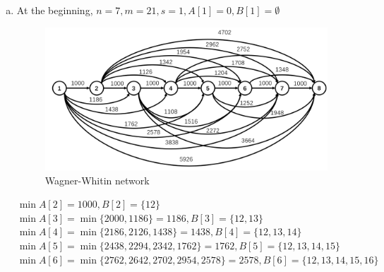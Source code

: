 \documentclass[a4paper]{article}
\begin{document}
\begin{enumerate}[(a)]
        \\$=\min\{3864,3678,3290,3302,3962,4702\}=3290$
        \\\\$\theta_1=K+\min\{\theta_2,hd_2+\theta_3,h(d_2+2\times d_3)+\theta_4,h(d_2+2\times d_3+3\times d_4)+\theta_5,h(d_2+2\times d_3+3\times d_4+4\times d_5)+\theta_6,h(d_2+2\times d_3+3\times d_4+4\times d_5+5\times d_6)+\theta_7,h(d_2+2\times d_3+3\times d_4+4\times d_5+5\times d_6+6\times d_7)+\theta_8\}$
        \\$=1000+\min\{3290,1.2\times155+2864,1.2\times(155+2\times105+2552,1.2\times(155+2\times105+3\times90)+1948,1.2\times(155+2\times105+3\times90+4\times170)+1348,1.2\times(155+2\times105+3\times90+4\times170+5\times210)+1000,1.2\times(155+2\times105+3\times90+4\times170+5\times210+6\times290)\}$
        \\$=\min\{4290,4050,3990,3710,3926,4838,5926\}=3710$
        \\\\Therefore, we should order $d_1,d_2,d_3,d_4$ at Sunday, and order $d_5,d_6,d_7$ at Thursday.
        \\The total cost is \$3710
        \item   At the beginning, $n=7,m=21,s=1, A[1]=0,B[1]=\emptyset$
        \begin{figure}[H]
            \centering
            \includegraphics[scale=0.25]{P3b.png}
            \caption{Wagner-Whitin network}
        \end{figure} 
        $\min A[2]=1000,B[2]=\{12\}$
        \\$\min A[3]=\min\{2000,1186\}=1186,B[3]=\{12,13\}$
        \\$\min A[4]=\min\{2186,2126,1438\}=1438,B[4]=\{12,13,14\}$
        \\$\min A[5]=\min\{2438,2294,2342,1762\}=1762,B[5]=\{12,13,14,15\}$
        \\$\min A[6]=\min\{2762,2642,2702,2954,2578\}=2578,B[6]=\{12,13,14,15,16\}$

\end{enumerate}
\end{document}
